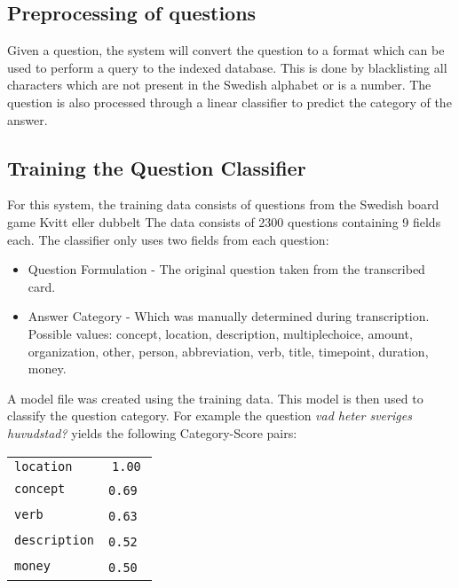 \subsection{Preprocessing of questions}
Given a question, the system will convert the question
to a format which can be used to perform a query to the indexed
database. This is done by blacklisting all characters which
are not present in the Swedish alphabet or is a number. The question is also
processed through a linear classifier to predict the category of the 
answer.

\subsection{Training the Question Classifier}
For this system, the training data consists of questions 
from the Swedish board game Kvitt eller dubbelt 
The data consists of 2300 questions containing 9 fields each.
The classifier only uses two fields from each question:

\begin{itemize}
\item Question Formulation - The original question taken from the transcribed
  card.
\item Answer Category - Which was manually determined during transcription. 
  Possible values: concept, location, description, multiplechoice, amount, organization, 
  other, person, abbreviation, verb, title, timepoint, duration, money.
\end{itemize}

A model file was created using the training data. This model is then used to classify
the question category. For example the question \textit{vad heter sveriges huvudstad?} 
yields the following Category-Score pairs:
\begin{center}
  \begin{tabular} {l c}
    \texttt{location}    & \texttt{1.00} \\
    \texttt{concept}     & \texttt{0.69} \\
    \texttt{verb}        & \texttt{0.63} \\
    \texttt{description} & \texttt{0.52} \\
    \texttt{money}       & \texttt{0.50} \\
  \end{tabular}
\end{center}
